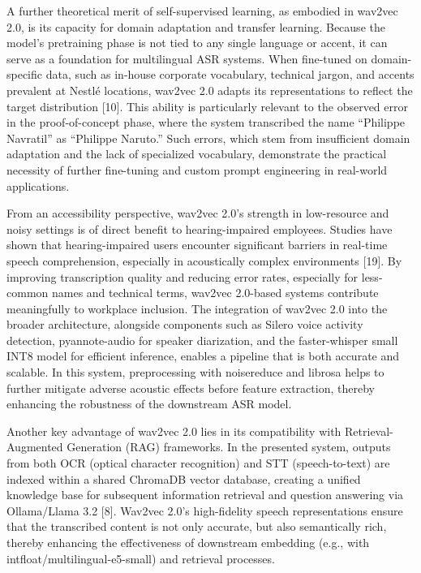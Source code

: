 \documentclass[12pt,a4paper]{article}
\begin{document}
A further theoretical merit of self-supervised learning, as embodied in wav2vec 2.0, is its capacity for domain adaptation and transfer learning. Because the model’s pretraining phase is not tied to any single language or accent, it can serve as a foundation for multilingual ASR systems. When fine-tuned on domain-specific data, such as in-house corporate vocabulary, technical jargon, and accents prevalent at Nestlé locations, wav2vec 2.0 adapts its representations to reflect the target distribution [10]. This ability is particularly relevant to the observed error in the proof-of-concept phase, where the system transcribed the name “Philippe Navratil” as “Philippe Naruto.” Such errors, which stem from insufficient domain adaptation and the lack of specialized vocabulary, demonstrate the practical necessity of further fine-tuning and custom prompt engineering in real-world applications.


From an accessibility perspective, wav2vec 2.0’s strength in low-resource and noisy settings is of direct benefit to hearing-impaired employees. Studies have shown that hearing-impaired users encounter significant barriers in real-time speech comprehension, especially in acoustically complex environments [19]. By improving transcription quality and reducing error rates, especially for less-common names and technical terms, wav2vec 2.0-based systems contribute meaningfully to workplace inclusion. The integration of wav2vec 2.0 into the broader architecture, alongside components such as Silero voice activity detection, pyannote-audio for speaker diarization, and the faster-whisper small INT8 model for efficient inference, enables a pipeline that is both accurate and scalable. In this system, preprocessing with noisereduce and librosa helps to further mitigate adverse acoustic effects before feature extraction, thereby enhancing the robustness of the downstream ASR model.


Another key advantage of wav2vec 2.0 lies in its compatibility with Retrieval-Augmented Generation (RAG) frameworks. In the presented system, outputs from both OCR (optical character recognition) and STT (speech-to-text) are indexed within a shared ChromaDB vector database, creating a unified knowledge base for subsequent information retrieval and question answering via Ollama/Llama 3.2 [8]. Wav2vec 2.0’s high-fidelity speech representations ensure that the transcribed content is not only accurate, but also semantically rich, thereby enhancing the effectiveness of downstream embedding (e.g., with intfloat/multilingual-e5-small) and retrieval processes.
\end{document}
